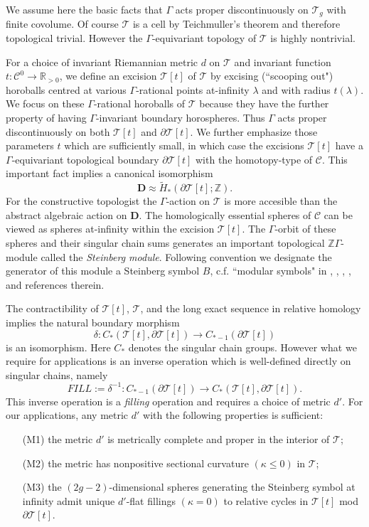 \documentclass[12pt]{amsart}
\theoremstyle{definition}
\theoremstyle{remark}
\newcommand{\bR}{\mathbb{R}}
\newcommand{\bZ}{\mathbb{Z}}
\newcommand{\del}{\partial}
\newcommand{\bD}{\textbf{D}}
\newcommand{\sC}{\mathscr{C}}
\newcommand{\sT}{\mathscr{T}}
\begin{document}
We assume here the basic facts that $\Gamma$ acts proper discontinuously on $\sT_g$ with finite covolume. Of course $\sT$ is a cell by Teichmuller's theorem and therefore topological trivial. However the $\Gamma$-equivariant topology of $\sT$ is highly nontrivial. 

For a choice of invariant Riemannian metric $d$ on $\sT$ and invariant function $t: \sC^0 \to \bR_{>0}$, we define an excision $\sT[t]$ of $\sT$ by excising (``scooping out") horoballs centred at various $\Gamma$-rational points at-infinity $\lambda$ and with radius $t(\lambda)$. We focus on these $\Gamma$-rational horoballs of $\sT$ because they have the further property of having $\Gamma$-invariant boundary horospheres. Thus $\Gamma$ acts proper discontinuously on both $\sT[t]$ and $\del \sT[t]$. We further emphasize those parameters $t$ which are sufficiently small, in which case the excisions $\sT[t]$  have a $\Gamma$-equivariant topological boundary $\del \sT[t]$ with the homotopy-type of $\sC$. This important fact implies a canonical isomorphism $$\bD\approx \tilde{H}_*(\del \sT[t]; \bZ).$$ For the constructive topologist the $\Gamma$-action on $\sT$ is more accesible than the abstract algebraic action on $\bD$. The homologically essential spheres of $\sC$ can be viewed as spheres at-infinity within the excision $\sT[t]$. The $\Gamma$-orbit of these spheres and their singular chain sums generates an important topological $\bZ \Gamma$-module called the \emph{Steinberg module}. Following convention we designate the generator of this module a Steinberg symbol $B$, c.f. ``modular symbols" in \cite{AR}, \cite{AGM}, \cite{Stein}, \cite{Sol}, and references therein. 

The contractibility of $\sT[t]$, $\sT$, and the long exact sequence in relative homology implies the natural boundary morphism $$\delta: C_*(\sT[t], \del \sT[t]) \to C_{*-1}(\del \sT[t])$$ is an isomorphism. Here $C_*$ denotes the singular chain groups. However what we require for applications is an inverse operation which is well-defined directly on singular chains, namely $$FILL:=\delta^{-1}: C_{*-1}(\del \sT[t]) \to C_*(\sT[t], \del \sT[t]).$$ This inverse operation is a \emph{filling} operation and requires a choice of metric $d'$. For our applications, any metric $d'$ with the following properties is sufficient:

\begin{itemize}
\item[(M1)] the metric $d'$ is metrically complete and proper in the interior of $\sT$;
\item[(M2)] the metric has nonpositive sectional curvature $(\kappa \leq 0)$ in $\sT$;
\item[(M3)] the $(2g-2)$-dimensional spheres generating the Steinberg symbol at infinity admit unique $d'$-flat fillings $(\kappa =0)$ to relative cycles in $\sT[t]$ mod $\del \sT[t]$.
\end{itemize}
\end{document}
